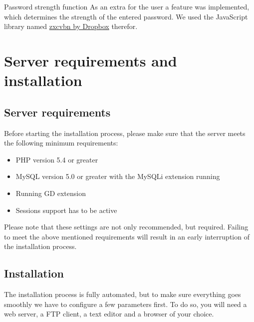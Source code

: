 \documentclass[a4paper,12pt,oneside]{article} %
\begin{document}
Password strength function
As an extra for the user a feature was implemented, which determines the strength of the entered password. We used the JavaScript library named \hyperlink{https://tech.dropbox.com/2012/04/zxcvbn-realistic-password-strength-estimation/}{zxcvbn by Dropbox} therefor.


\newpage

\section{Server requirements and installation}

\subsection{Server requirements}

Before starting the installation process, please make sure that the server meets the following minimum requirements:
\begin{itemize}
\item PHP version 5.4 or greater
\item MySQL version 5.0 or greater with the MySQLi extension running
\item Running GD extension
\item Sessions support has to be active
\end{itemize}

Please note that these settings are not only recommended, but required.
Failing to meet the above mentioned requirements will result in an early interruption of the installation process.

\subsection{Installation}

The installation process is fully automated, but to make sure everything goes smoothly we have to configure a
few parameters first. To do so, you will need a web server, a FTP client, a text editor and a browser of your choice.
\end{document}
